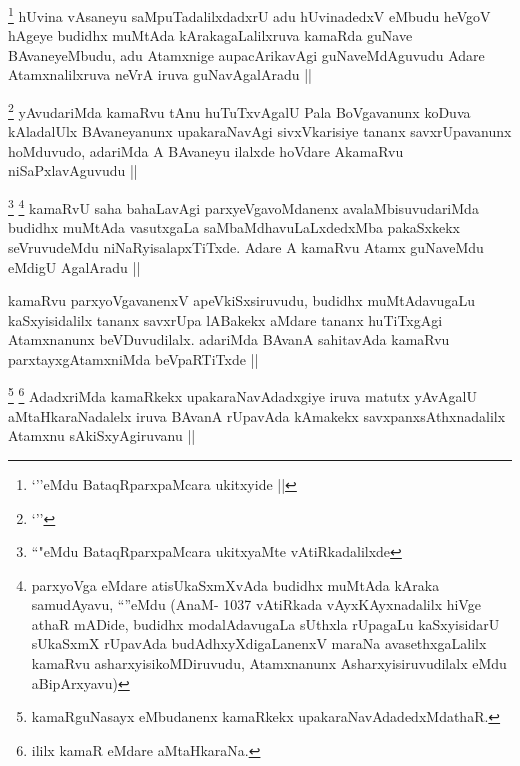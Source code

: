 \begin{artha}
\footnote{`\stext''eMdu BataqRparxpaMcara ukitxyide ||}
hUvina vAsaneyu saMpuTadalilxdadxrU adu hUvinadedxV eMbudu heVgoV hAgeye budidhx muMtAda kArakagaLalilxruva kamaRda guNave BAvaneyeMbudu, adu Atamxnige aupacArikavAgi guNaveMdAguvudu Adare Atamxnalilxruva neVrA iruva guNavAgalAradu ||
\end{artha}


\begin{artha}
\footnote{`\stext''}
yAvudariMda kamaRvu tAnu huTuTxvAgalU Pala BoVgavanunx koDuva kAladalUlx BAvaneyanunx upakaraNavAgi sivxVkarisiye tananx savxrUpavanunx hoMduvudo, adariMda A BAvaneyu ilalxde hoVdare AkamaRvu niSaPxlavAguvudu ||
\end{artha}


\begin{artha}
\footnote{``\stext"eMdu BataqRparxpaMcara ukitxyaMte vAtiRkadalilxde}
\footnote{parxyoVga eMdare atisUkaSxmXvAda budidhx muMtAda kAraka samudAyavu, ``\stext''eMdu (AnaM- 1037 vAtiRkada vAyxKAyxnadalilx hiVge athaR mADide, budidhx modalAdavugaLa sUthxla rUpagaLu kaSxyisidarU sUkaSxmX rUpavAda budAdhxyXdigaLanenxV maraNa avasethxgaLalilx kamaRvu asharxyisikoMDiruvudu, Atamxnanunx Asharxyisiruvudilalx eMdu aBipArxyavu)}
kamaRvU saha bahaLavAgi parxyeVgavoMdanenx avalaMbisuvudariMda budidhx muMtAda vasutxgaLa saMbaMdhavuLaLxdedxMba pakaSxkekx seVruvudeMdu niNaRyisalapxTiTxde. Adare A kamaRvu Atamx guNaveMdu eMdigU AgalAradu ||
\end{artha}

\begin{artha}
kamaRvu parxyoVgavanenxV apeVkiSxsiruvudu, budidhx muMtAdavugaLu kaSxyisidalilx tananx savxrUpa lABakekx aMdare tananx huTiTxgAgi Atamxnanunx beVDuvudilalx. adariMda BAvanA sahitavAda kamaRvu parxtayxgAtamxniMda beVpaRTiTxde ||
\end{artha}

\begin{artha}
\footnote{kamaRguNasayx eMbudanenx kamaRkekx upakaraNavAdadedxMdathaR.}
\footnote{ililx kamaR eMdare aMtaHkaraNa.}
AdadxriMda kamaRkekx upakaraNavAdadxgiye iruva matutx yAvAgalU aMtaHkaraNadalelx iruva BAvanA rUpavAda kAmakekx savxpanxsAthxnadalilx Atamxnu sAkiSxyAgiruvanu ||
\end{artha}

